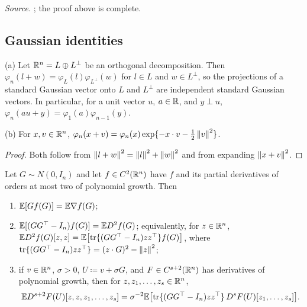 \emph{Source.} ; the proof above is complete.

\subsection{Gaussian identities}\label{tb:sec:gauss}

\begin{fact}\label{tb:gauss-coord}
(a) Let \(\mathbb R^n=L\oplus L^\perp\) be an orthogonal decomposition. Then
\(\varphi_n(l+w)=\varphi_L(l)\varphi_{L^\perp}(w)\) for \(l\in L\) and
\(w\in L^\perp\), so the projections of a standard Gaussian vector onto
\(L\) and \(L^\perp\) are independent standard Gaussian vectors. In
particular, for a unit vector \(u\), \(a\in\mathbb R\), and \(y\perp u\),
\(\varphi_n(au+y)=\varphi_1(a)\varphi_{n-1}(y)\).

(b) For \(x,v\in\mathbb R^n\),
\(\varphi_n(x+v)=\varphi_n(x)\exp\{-x\cdot v-\tfrac12\left\lVert v\right\rVert^2\}\).
\end{fact}

\begin{proof}
Both follow from \(\left\lVert l+w\right\rVert^2=\left\lVert l\right\rVert^2+\left\lVert w\right\rVert^2\) and from expanding
\(\left\lVert x+v\right\rVert^2\).
\end{proof}


\begin{fact}\label{tb:stein}
Let \(G\sim N(0,I_n)\) and let \(f\in C^2(\mathbb R^n)\) have \(f\) and its partial
derivatives of orders at most two of polynomial growth. Then
\begin{enumerate}
\item[(a)] \(\mathbb E[Gf(G)]=\mathbb E\nabla f(G)\);
\item[(b)] \(\mathbb E[(GG^\top-I_n)f(G)]=\mathbb E D^2f(G)\); equivalently, for \(z\in\mathbb R^n\),
\(\mathbb E D^2f(G)[z,z]=\mathbb E\bigl[\operatorname{tr}\{(GG^\top-I_n)zz^\top\}f(G)\bigr]\), where
\(\operatorname{tr}\{(GG^\top-I_n)zz^\top\}=(z\cdot G)^2-\left\lVert z\right\rVert^2\);
\item[(c)] if \(v\in\mathbb R^n\), \(\sigma>0\), \(U\coloneqq v+\sigma G\), and
\(F\in C^{s+2}(\mathbb R^n)\) has derivatives of polynomial growth, then for
\(z,z_1,\ldots,z_s\in\mathbb R^n\),
\[
 \mathbb E D^{s+2}F(U)[z,z,z_1,\ldots,z_s]
 =\sigma^{-2}\mathbb E\bigl[\operatorname{tr}\{(GG^\top-I_n)zz^\top\}\,
 D^sF(U)[z_1,\ldots,z_s]\bigr].
\]
\end{enumerate}
\end{fact}

